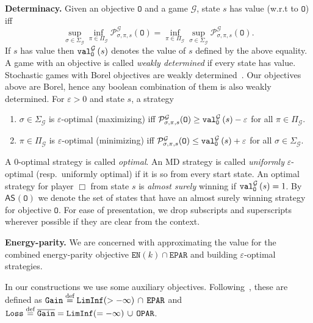 \documentclass[a4paper,UKenglish,cleveref,autoref,thm-restate]{lipics-v2021}
\DeclareMathOperator{\Term}{\mathtt{Term}}
\DeclareMathOperator{\Gain}{\mathtt{Gain}}
\DeclareMathOperator{\Loss}{\mathtt{Loss}}
\newcommand{\Eparity}{\mathtt{EPAR}}
\newcommand{\Oparity}{\mathtt{OPAR}}
\newcommand{\LimInf}[2]{\mathtt{LimInf}(#1 #2)}
\newcommand{\en}{\mathtt{EN}}
\newcommand{\+}[1]{\mathbb{#1}}
\newcommand{\?}[1]{\mathcal{#1}}
\newcommand{\zsymbol}{\Box}
\newcommand{\eqby}[2][=]{\stackrel{\text{{\tiny{#2}}}}{#1}}
\newcommand{\eqdef}{\eqby{def}}
\newcommand{\eps}{\varepsilon}
\newcommand{\Prob}[2][]{\mathcal{P}^{#1}_{#2}}
\newcommand{\obj}{\mathtt{O}}
\newcommand{\game}{{\mathcal G}}
\newcommand{\s}{s}
\newcommand{\complementof}[1]{\overline{#1}}
\newcommand{\zstrat}{\sigma}
\newcommand{\ostrat}{\pi}
\newcommand{\zallstrats}[1]{\zstratset_{{#1}}}
\newcommand{\oallstrats}[1]{\ostratset_{{#1}}}
\newcommand{\zstratset}{\Sigma}
\newcommand{\ostratset}{\Pi}
\newcommand{\pz}{\zsymbol}
\newcommand{\AS}[2][]{\mathsf{AS}^{#1}\left(#2\right)}
\begin{document}
\textbf{Determinacy.}
Given an objective $\obj$ and a game $\game$, state $\s$ has value (w.r.t to $\obj$) iff 
$$\sup_{\zstrat \in \zallstrats{\game}}\inf_{\ostrat \in \oallstrats{\game}} \Prob[\game]{\zstrat,\ostrat,\s}(\obj) = \inf_{\ostrat \in \oallstrats{\game}}\sup_{\zstrat \in \zallstrats{\game}} \Prob[\game]{\zstrat,\ostrat,\s}(\obj).$$
If $\s$ has value then $\valueof[\game][\obj]{\s}$ denotes the value of
$\s$ defined by the above equality. A game with an objective is called
\textit{weakly determined} if every state has value.
Stochastic games with Borel objectives are weakly
determined~\cite{Maitra-Sudderth:2003,M1998}.
Our objectives above are Borel, hence any boolean combination of them is also
weakly determined.
For $\eps > 0$ and state $\s$, a strategy
\begin{enumerate}
    \item $\zstrat \in \zallstrats{\game}$ is $\eps$-optimal (maximizing) iff $\Prob[\game]{\zstrat,\ostrat,\s}(\obj) \ge \valueof[\game][\obj]{\s} - \eps$ for all $\ostrat \in \oallstrats{\game}$.
    \item $\ostrat \in \oallstrats{\game}$ is $\eps$-optimal (minimizing) iff $\Prob[\game]{\zstrat,\ostrat,\s}(\obj) \le \valueof[\game][\obj]{\s} + \eps$ for all $\zstrat \in \zallstrats{\game}$.
\end{enumerate}
A $0$-optimal strategy is called \emph{optimal}.
An MD strategy is called \emph{uniformly} $\eps$-optimal (resp.\ uniformly optimal)
if it is so from every start state.
An optimal strategy for player $\pz$ from state $\s$
is \emph{almost surely} winning if $\valueof[\game][\obj]{\s}=1$.
By $\AS{\obj}$ we denote the set of states that have an almost surely winning
strategy for objective $\obj$. For ease of presentation, we drop subscripts and superscripts wherever possible if they are clear from the context.
     
% 

\textbf{Energy-parity.}
We are concerned with approximating the value for the combined energy-parity
objective $\en(k) \cap \Eparity$ and building $\eps$-optimal strategies.

In our constructions we use some auxiliary objectives.
Following~\cite{MSTW2021}, these are defined as
$\Gain \eqdef \LimInf{>}{-\infty}\, \cap\, \Eparity$
and
$\Loss \eqdef \complementof{\Gain} = \LimInf{=}{-\infty}\, \cup\, \Oparity$.
\end{document}
